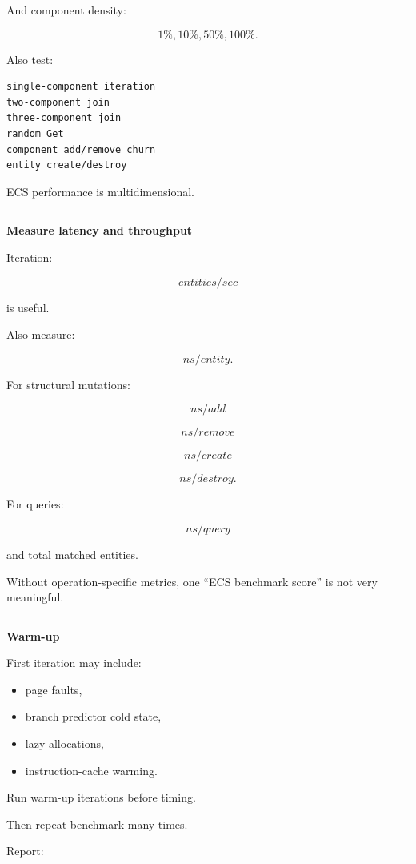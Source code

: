 And component density:

\[
1\%,10\%,50\%,100\%.
\]

Also test:

\begin{verbatim}
single-component iteration
two-component join
three-component join
random Get
component add/remove churn
entity create/destroy
\end{verbatim}

ECS performance is multidimensional.

\begin{center}\rule{0.5\linewidth}{0.5pt}\end{center}

\textbf{Measure latency and throughput}

Iteration:

\[
entities/sec
\]

is useful.

Also measure:

\[
ns/entity.
\]

For structural mutations:

\[
ns/add
\]

\[
ns/remove
\]

\[
ns/create
\]

\[
ns/destroy.
\]

For queries:

\[
ns/query
\]

and total matched entities.

Without operation-specific metrics, one ``ECS benchmark score'' is not very meaningful.

\begin{center}\rule{0.5\linewidth}{0.5pt}\end{center}

\textbf{Warm-up}

First iteration may include:

\begin{itemize}
\tightlist
\item
  page faults,
\item
  branch predictor cold state,
\item
  lazy allocations,
\item
  instruction-cache warming.
\end{itemize}

Run warm-up iterations before timing.

Then repeat benchmark many times.

Report:

